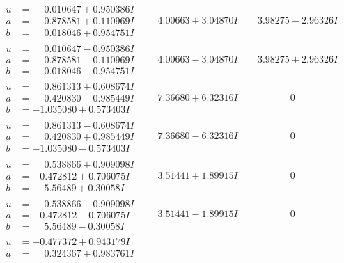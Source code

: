 \documentclass[1p]{elsarticle_modified}
\theoremstyle{definition}
\begin{document}
$$\begin{array}{c|c|c}
\begin{aligned}
u &= \phantom{-}0.010647 + 0.950386 I \\
a &= \phantom{-}0.878581 + 0.110969 I \\
b &= \phantom{-}0.018046 + 0.954751 I\end{aligned}
 & \phantom{-}4.00663 + 3.04870 I & \phantom{-}3.98275 - 2.96326 I \\ \hline\begin{aligned}
u &= \phantom{-}0.010647 - 0.950386 I \\
a &= \phantom{-}0.878581 - 0.110969 I \\
b &= \phantom{-}0.018046 - 0.954751 I\end{aligned}
 & \phantom{-}4.00663 - 3.04870 I & \phantom{-}3.98275 + 2.96326 I \\ \hline\begin{aligned}
u &= \phantom{-}0.861313 + 0.608674 I \\
a &= \phantom{-}0.420830 - 0.985449 I \\
b &= -1.035080 + 0.573403 I\end{aligned}
 & \phantom{-}7.36680 + 6.32316 I & \phantom{-0.000000 } 0 \\ \hline\begin{aligned}
u &= \phantom{-}0.861313 - 0.608674 I \\
a &= \phantom{-}0.420830 + 0.985449 I \\
b &= -1.035080 - 0.573403 I\end{aligned}
 & \phantom{-}7.36680 - 6.32316 I & \phantom{-0.000000 } 0 \\ \hline\begin{aligned}
u &= \phantom{-}0.538866 + 0.909098 I \\
a &= -0.472812 + 0.706075 I \\
b &= \phantom{-}5.56489 + 0.30058 I\end{aligned}
 & \phantom{-}3.51441 + 1.89915 I & \phantom{-0.000000 } 0 \\ \hline\begin{aligned}
u &= \phantom{-}0.538866 - 0.909098 I \\
a &= -0.472812 - 0.706075 I \\
b &= \phantom{-}5.56489 - 0.30058 I\end{aligned}
 & \phantom{-}3.51441 - 1.89915 I & \phantom{-0.000000 } 0 \\ \hline\begin{aligned}
u &= -0.477372 + 0.943179 I \\
a &= \phantom{-}0.324367 + 0.983761 I \\

\end{aligned}
\end{array}$$
\end{document}
